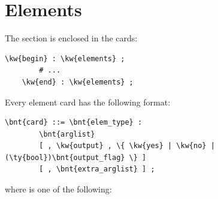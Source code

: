 \chapter{Elements}\label{sec:ELEMENTS}
The  section is enclosed in the cards:
\begin{Verbatim}[commandchars=\\\{\}]
    \kw{begin} : \kw{elements} ;
        # ...
    \kw{end} : \kw{elements} ;
\end{Verbatim}
Every element card has the following format:
\begin{Verbatim}[commandchars=\\\{\}]
    \bnt{card} ::= \bnt{elem_type} :
        \bnt{arglist}
        [ , \kw{output} , \{ \kw{yes} | \kw{no} | (\ty{bool})\bnt{output_flag} \} ]
        [ , \bnt{extra_arglist} ] ;
\end{Verbatim}
where  is one of the following:
